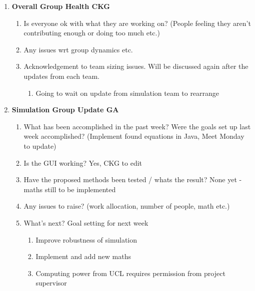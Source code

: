 \begin{enumerate}
\item  \textbf{Overall Group Health CKG}

\begin{enumerate}
\item Is everyone ok with what they are working on? (People feeling they aren't contributing enough or doing too much etc.)

\item  Any issues wrt group dynamics etc.

\item  Acknowledgement to team sizing issues. Will be discussed again after the updates from each team.

\begin{enumerate}
\item  Going to wait on update from simulation team to rearrange\\
\end{enumerate}
\end{enumerate}

\item  \textbf{Simulation Group Update GA}

\begin{enumerate}
\item What has been accomplished in the past week? Were the goals set up last week accomplished? (Implement found equations in Java, Meet Monday to update)

\item  Is the GUI working? Yes, CKG to edit

\item  Have the proposed methods been tested / whats the result? None yet - maths still to be implemented

\item  Any issues to raise? (work allocation, number of people,  math etc.)

\item  What's next? Goal setting for next week

\begin{enumerate}
\item  Improve robustness of simulation

\item  Implement and add new maths

\item  Computing power from UCL requires permission from project supervisor\\
\end{enumerate}
\end{enumerate}


\end{enumerate}
